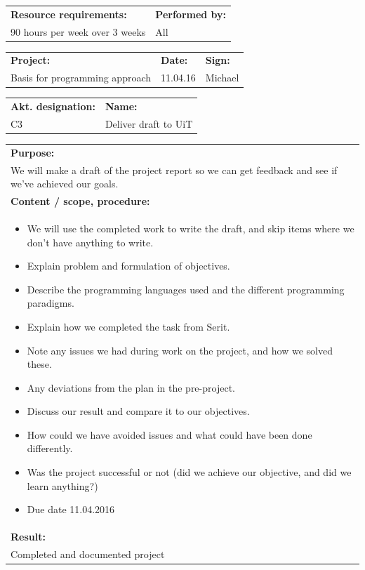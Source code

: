 \documentclass[12pt, a4paper]{article}
\begin{document}
\begin{tabularx}{\textwidth}{|X|p{30mm}|}
	\textbf{Resource requirements:}&\textbf{Performed by:}\\
	90 hours per week over 3 weeks&All\\
	\hline
\end{tabularx}

\newpage

\begin{tabularx}{\textwidth}{|X|p{32mm}|p{20mm}|}
	\hline
	\textbf{Project:}&\textbf{Date:}&\textbf{Sign:}\\
	Basis for programming approach&11.04.16&Michael\\
	\hline
\end{tabularx}

\begin{tabularx}{\textwidth}{|p{40mm}|X|}
	\textbf{Akt. designation:}&\textbf{Name:}\\
	C3&Deliver draft to UiT  \\
	\hline
\end{tabularx}

\begin{tabularx}{\textwidth}{|X|}
	\textbf{Purpose:}\\
	 We will make a draft of the project report so we can get feedback and see if we’ve achieved our goals.\\
	\hline
	\textbf{Content / scope, procedure:}\\
	\begin{itemize}
		\item We will use the completed work to write the draft, and skip items where we don’t have anything to write.
		\item Explain problem and formulation of objectives.
		\item Describe the programming languages used and the different programming paradigms.
		\item Explain how we completed the task from Serit.
		\item Note any issues we had during work on the project, and how we solved these.
		\item Any deviations from the plan in the pre-project.
		\item Discuss our result and compare it to our objectives.
		\item How could we have avoided issues and what could have been done differently.
		\item Was the project successful or not (did we achieve our objective, and did we learn anything?)
		\item Due date 11.04.2016

	\end{itemize}\\
 	\hline
	\textbf{Result:}\\
	Completed and documented project \\
	\hline
\end{tabularx}
\end{document}
